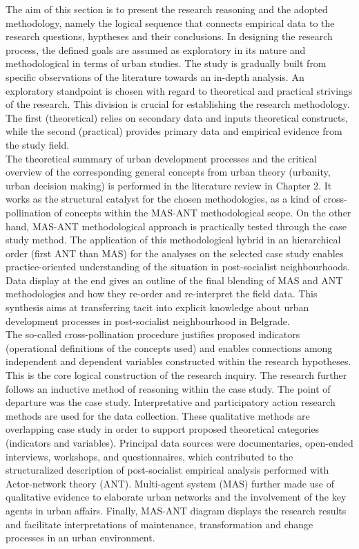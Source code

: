 \documentclass[11pt]{report}
\begin{document}
The aim of this section is to present the research reasoning and the adopted methodology, namely the logical sequence that connects empirical data to the research questions, hyptheses and their conclusions. In designing the research process, the defined goals are assumed as exploratory in its nature and methodological in terms of urban studies. The study is gradually built from specific observations of the literature towards an in-depth analysis. An exploratory standpoint is chosen with regard to theoretical and practical strivings of the research. This division is crucial for establishing the research methodology. The first (theoretical) relies on secondary data and inputs theoretical constructs, while the second (practical) provides primary data and empirical evidence from the study field.
\\
The theoretical summary of urban development processes and the critical overview of the corresponding general concepts from urban theory (urbanity, urban decision making) is performed in the literature review in Chapter 2. It works as the structural catalyst for the chosen methodologies, as a kind of cross-pollination of concepts within the MAS-ANT methodological scope. On the other hand, MAS-ANT methodological approach is practically tested through the case study method. The application of this methodological hybrid in an hierarchical order (first ANT than MAS) for the analyses on the selected case study enables practice-oriented understanding of the situation in post-socialist neighbourhoods. Data display at the end gives an outline of the final blending of MAS and ANT methodologies and how they re-order and re-interpret the field data. This synthesis aims at transferring tacit into explicit knowledge about urban development processes in post-socialist neighbourhood in Belgrade.
\\
The so-called cross-pollination procedure justifies proposed indicators (operational definitions of the concepts used) and enables connections among independent and dependent variables constructed within the research hypotheses. This is the core logical construction of the research inquiry. The research further follows an inductive method of reasoning within the case study. The point of departure was the case study. Interpretative and participatory action research methods are used for the data collection. These qualitative methods are overlapping case study in order to support proposed theoretical categories (indicators and variables). Principal data sources were documentaries, open-ended interviews, workshops, and questionnaires, which contributed to the structuralized description of post-socialist empirical analysis performed with Actor-network theory (ANT). Multi-agent system (MAS) further made use of qualitative evidence to elaborate urban networks and the involvement of the key agents in urban affairs. Finally, MAS-ANT diagram displays the research results and facilitate interpretations of maintenance, transformation and change processes in an urban environment.
\end{document}
